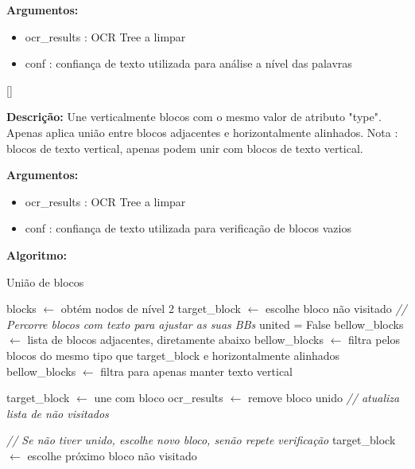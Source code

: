 \textbf{Argumentos:}
\begin{itemize}\setlength\itemsep{-0.3em}
	\item ocr\_results : OCR Tree a limpar
	\item conf : confiança de texto utilizada para análise a nível das palavras
\end{itemize}


[\normalsize]

\textbf{Descrição:} Une verticalmente blocos com o mesmo valor de atributo "type". Apenas aplica união entre blocos adjacentes e horizontalmente alinhados. Nota : blocos de texto vertical, apenas podem unir com blocos de texto vertical.

\textbf{Argumentos:}
\begin{itemize}\setlength\itemsep{-0.3em}
	\item ocr\_results : OCR Tree a limpar
	\item conf : confiança de texto utilizada para verificação de blocos vazios
\end{itemize}

\textbf{Algoritmo:}
\begin{breakablealgorithm}
	\caption{União de blocos}
	\begin{algorithmic}[1]
		
		\State blocks $\leftarrow$ obtém nodos de nível 2
		\State target\_block $\leftarrow$ escolhe bloco não visitado
		\State \textit{// Percorre blocos com texto para ajustar as suas BBs}
			\State united = False
			\State bellow\_blocks $\leftarrow$ lista de blocos adjacentes, diretamente abaixo
			\State bellow\_blocks $\leftarrow$ filtra pelos blocos do mesmo tipo que target\_block e horizontalmente alinhados
					\State bellow\_blocks $\leftarrow$ filtra para apenas manter texto vertical
				\EndIf
				
					\State target\_block $\leftarrow$ une com bloco
					\State ocr\_results $\leftarrow$ remove bloco unido
					\State \textit{// atualiza lista de não visitados}
				\EndIf
				
			\EndIf
			
			\State \textit{// Se não tiver unido, escolhe novo bloco, senão repete verificação}
				\State target\_block $\leftarrow$ escolhe próximo bloco não visitado
			\EndIf
		\EndWhile
		
		
	\end{algorithmic}
\end{breakablealgorithm}

